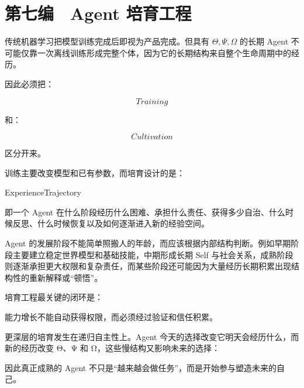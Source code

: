 \part{第七编　Agent 培育工程}
传统机器学习把模型训练完成后即视为产品完成。但具有 \(\Theta,\Psi,\Omega\) 的长期 Agent 不可能仅靠一次离线训练形成完整个体，因为它的长期结构来自整个生命周期中的经历。

因此必须把：

$$
Training
$$

和：

$$
Cultivation
$$

区分开来。

训练主要改变模型和已有参数，而培育设计的是：

\begin{statementbox}
ExperienceTrajectory
\end{statementbox}

即一个 Agent 在什么阶段经历什么困难、承担什么责任、获得多少自治、什么时候反思、什么时候恢复以及如何逐渐进入新的经验空间。

Agent 的发展阶段不能简单照搬人的年龄，而应该根据内部结构判断。例如早期阶段主要建立稳定世界模型和基础技能，中期形成长期 Self 与社会关系，成熟阶段则逐渐承担更大权限和复杂责任，而某些阶段还可能因为大量经历长期积累出现结构性的重新解释或“顿悟”。

培育工程最关键的闭环是：

\begin{statementbox}
\centering
{}
\end{statementbox}

能力增长不能自动获得权限，而必须经过验证和信任积累。

更深层的培育发生在递归自主性上。Agent 今天的选择改变它明天会经历什么，而新的经历改变 Θ、Ψ 和 Ω，这些慢结构又影响未来的选择：

\begin{statementbox}
\centering
{}
\end{statementbox}

因此真正成熟的 Agent 不只是“越来越会做任务”，而是开始参与塑造未来的自己。











